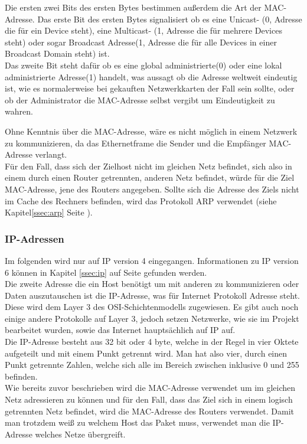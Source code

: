 \documentclass[11pt,a4paper]{report}
\begin{document}
Die ersten zwei Bits des ersten Bytes bestimmen außerdem die Art der MAC-Adresse. Das erste Bit des ersten Bytes signalisiert ob es eine Unicast- (0, Adresse die für ein Device steht), eine Multicast- (1, Adresse die für mehrere Devices steht) oder sogar Broadcast Adresse(1, Adresse die für alle Devices in einer Broadcast Domain steht) ist.\\
Das zweite Bit steht dafür ob es eine global administrierte(0) oder eine lokal administrierte Adresse(1) handelt, was aussagt ob die Adresse weltweit eindeutig ist, wie es normalerweise bei gekauften Netzwerkkarten der Fall sein sollte, oder ob der Administrator die MAC-Adresse selbst vergibt um Eindeutigkeit zu wahren.

Ohne Kenntnis über die MAC-Adresse, wäre es nicht möglich in einem Netzwerk zu kommunizieren, da das Ethernetframe die Sender und die Empfänger MAC-Adresse verlangt.\\
Für den Fall, dass sich der Zielhost nicht im gleichen Netz befindet, sich also in einem durch einen Router getrennten, anderen Netz befindet, würde für die Ziel MAC-Adresse, jene des Routers angegeben. Sollte sich die Adresse des Ziels nicht im Cache des Rechners befinden, wird das Protokoll ARP verwendet (siehe Kapitel\ref{ssec:arp} Seite \pageref{ssec:arp}). 
\subsubsection{IP-Adressen}\label{sssec:ipaddr}
Im folgenden wird nur auf IP version 4 eingegangen. Informationen zu IP version 6 können in Kapitel \ref{ssec:ip} auf Seite \pageref{ssec:ip} gefunden werden.\\

Die zweite Adresse die ein Host benötigt um mit anderen zu kommunizieren oder Daten auszutauschen ist die IP-Adresse, was für Internet Protokoll Adresse steht. Diese wird dem Layer 3 des OSI-Schichtenmodells zugewiesen. Es gibt auch noch einige andere Protokolle auf Layer 3, jedoch setzen Netzwerke, wie sie im Projekt bearbeitet wurden, sowie das Internet hauptsächlich auf IP auf.\\

Die IP-Adresse besteht aus 32 bit oder 4 byte, welche in der Regel in vier Oktete aufgeteilt und mit einem Punkt getrennt wird. Man hat also vier, durch einen Punkt getrennte Zahlen, welche sich alle im Bereich zwischen inklusive 0 und 255 befinden.\\

Wie bereits zuvor beschrieben wird die MAC-Adresse verwendet um im gleichen Netz adressieren zu können und für den Fall, dass das Ziel sich in einem logisch getrennten Netz befindet, wird die MAC-Adresse des Routers verwendet. Damit man trotzdem weiß zu welchem Host das Paket muss, verwendet man die IP-Adresse welches Netze übergreift.\\
\end{document}
